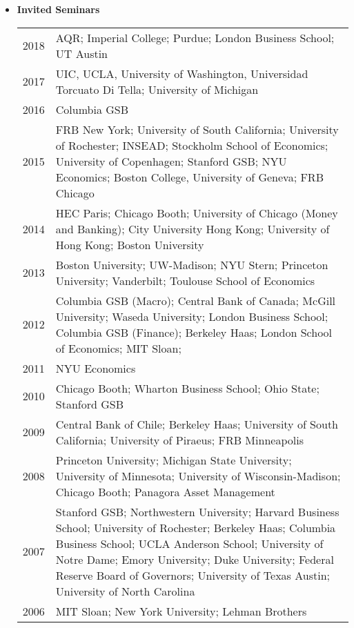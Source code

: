 \documentclass[12pt,letterpaper,serif,overlapped]{res}
\begin{document}
\begin{resume}
\begin{itemize}
\item \textbf{Invited Seminars}
\begin{longtable}{lp{15cm}}
2018 & AQR;  Imperial College; Purdue; London Business School; UT Austin\\[0.1cm]
2017 & UIC, UCLA, University of Washington, Universidad Torcuato Di Tella; University of Michigan \\[0.1cm]
2016 & Columbia GSB\\[0.1cm]
2015 & FRB New York; University of South California; University of Rochester; INSEAD; Stockholm School of Economics; University of Copenhagen; Stanford GSB; NYU Economics; Boston College, University of Geneva; FRB Chicago\\[0.1cm]
2014 &HEC Paris; Chicago Booth; University of Chicago (Money and Banking); City University Hong Kong; University of Hong Kong; Boston University\\[0.1cm]
2013 & Boston University; UW-Madison; NYU Stern; Princeton University; Vanderbilt; Toulouse School of Economics \\[0.1cm]
2012 & Columbia GSB (Macro); Central Bank of Canada; McGill University; Waseda University; London Business School; Columbia GSB (Finance); Berkeley Haas;  London School of Economics; MIT Sloan;\\[0.1cm]
2011 & NYU Economics\\[0.1cm]
2010 & Chicago Booth; Wharton Business School; Ohio State; Stanford GSB\\[0.1cm]
2009 & Central Bank of Chile; Berkeley Haas; University of South California;   University of Piraeus; FRB Minneapolis\\[0.1cm]
2008 & Princeton University; Michigan State University; University of Minnesota;    University of Wisconsin-Madison; Chicago Booth; Panagora Asset Management\\[0.1cm]
2007 & Stanford GSB; Northwestern University; Harvard Business School;   University of Rochester; Berkeley Haas; Columbia Business School;  UCLA Anderson School; University of Notre Dame;    Emory University; Duke University; Federal Reserve Board of Governors;  University of Texas Austin; University of North Carolina\\[0.1cm]
2006 & MIT Sloan; New York University; Lehman Brothers\\
\end{longtable}



\end{itemize}
\end{resume}
\end{document}
